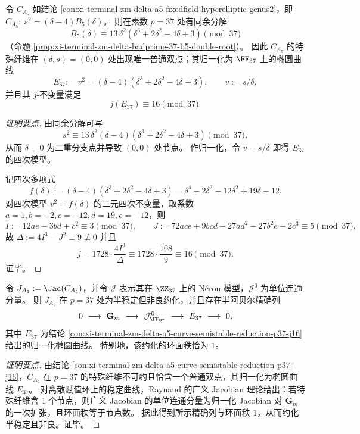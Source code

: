 

\begin{conclusion}[素数 \texorpdfstring{$p=37$}{p=37} 处的半稳定约化与 \texorpdfstring{$j\equiv 16$}{j=16}]\label{con:xi-terminal-zm-delta-a5-curve-semistable-reduction-p37-j16}
令 \(C_{A_5}\) 如结论 \ref{con:xi-terminal-zm-delta-a5-fixedfield-hyperelliptic-genus2}，即
\(
C_{A_5}:\ s^2=(\delta-4)B_5(\delta)
\)。
则在素数 \(p=37\) 处有同余分解
\[
B_5(\delta)\equiv 13\,\delta^2(\delta^3+2\delta^2-4\delta+3)\pmod{37}
\]
（命题 \ref{prop:xi-terminal-zm-delta-badprime-37-b5-double-root}）。
因此 \(C_{A_5}\) 的特殊纤维在 \((\delta,s)=(0,0)\) 处出现唯一普通双点；其归一化为 \(\FF_{37}\) 上的椭圆曲线
\[
E_{37}:\quad v^2=(\delta-4)(\delta^3+2\delta^2-4\delta+3),
\qquad v:=s/\delta,
\]
并且其 \(j\)-不变量满足
\[
j(E_{37})\equiv 16\pmod{37}.
\]
\end{conclusion}
\begin{proof}[证明要点]
由同余分解可写
\[
s^2\equiv 13\,\delta^2(\delta-4)(\delta^3+2\delta^2-4\delta+3)\pmod{37},
\]
从而 \(\delta=0\) 为二重分支点并导致 \((0,0)\) 处节点。
作归一化，令 \(v=s/\delta\) 即得 \(E_{37}\) 的四次模型。
\par
记四次多项式
\[
f(\delta):=(\delta-4)(\delta^3+2\delta^2-4\delta+3)=\delta^4-2\delta^3-12\delta^2+19\delta-12.
\]
对四次模型 \(v^2=f(\delta)\) 的二元四次不变量，取系数 \(a=1,b=-2,c=-12,d=19,e=-12\)，则
\[
I:=12ae-3bd+c^2\equiv 3\pmod{37},\qquad
J:=72ace+9bcd-27ad^2-27b^2e-2c^3\equiv 5\pmod{37},
\]
故
\(
\Delta:=4I^3-J^2\equiv 9\not\equiv 0
\)
并且
\[
j=1728\cdot\frac{4I^3}{\Delta}\equiv 1728\cdot\frac{108}{9}\equiv 16\pmod{37}.
\]
证毕。
\end{proof}

\begin{conclusion}[\texorpdfstring{$p=37$}{p=37} 处 \texorpdfstring{$\Jac(C_{A_5})$}{Jac(CA5)} 的半稳定约化：环面秩与椭圆归一化核]\label{con:xi-terminal-zm-delta-jac-ca5-neron-model-torus-rank1}
令 \(J_{A_5}:=\Jac(C_{A_5})\)，并令 \(\mathcal J\) 表示其在 \(\ZZ_{37}\) 上的 N\'eron 模型，\(\mathcal J^0\) 为单位连通分量。
则 \(J_{A_5}\) 在 \(p=37\) 处为半稳定但非良约化，并且存在半阿贝尔精确列
\[
0\ \longrightarrow\ \mathbf G_m\ \longrightarrow\ \mathcal J^0_{\FF_{37}}\ \longrightarrow\ E_{37}\ \longrightarrow\ 0,
\]
其中 \(E_{37}\) 为结论 \ref{con:xi-terminal-zm-delta-a5-curve-semistable-reduction-p37-j16} 给出的归一化椭圆曲线。
特别地，该约化的环面秩恰为 \(1\)。
\end{conclusion}
\begin{proof}[证明要点]
由结论 \ref{con:xi-terminal-zm-delta-a5-curve-semistable-reduction-p37-j16}，\(C_{A_5}\) 在 \(p=37\) 的特殊纤维不可约且恰含一个普通双点，其归一化为椭圆曲线 \(E_{37}\)。
对离散赋值环上的稳定曲线，Raynaud 的广义 Jacobian 理论给出：若特殊纤维含 \(1\) 个节点，则广义 Jacobian 的单位连通分量为归一化 Jacobian 对 \(\mathbf G_m\) 的一次扩张，且环面秩等于节点数。
据此得到所示精确列与环面秩 \(1\)，从而约化半稳定且非良。证毕。
\end{proof}



\endinput

